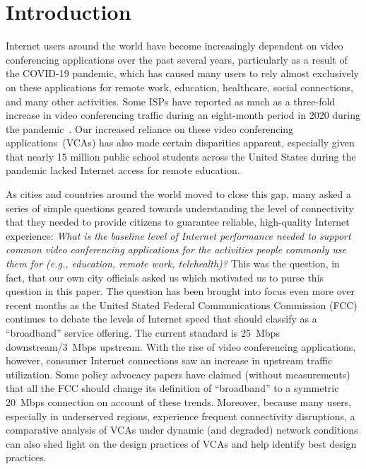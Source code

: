 \section{Introduction}\label{sec:intro}

Internet users around the world have become increasingly dependent on video
conferencing applications over the past several years, particularly as a
result of the COVID-19 pandemic, which has caused many users to rely almost
exclusively on these applications for remote work, education, healthcare,
social connections, and many other activities.  Some ISPs have reported as
much as a three-fold increase in video conferencing traffic during an
eight-month period in 2020 during the pandemic~\cite{bitag_report}. Our
increased reliance on these video conferencing applications~(VCAs) has also
made certain disparities apparent, especially given that nearly 15 million
public school students across the United States during the pandemic lacked
Internet access for remote education. 

As cities and countries around the world moved to close this gap, many asked a
series of simple questions geared towards understanding the level of
connectivity that they needed to provide citizens to guarantee reliable,
high-quality Internet experience: {\em What is the baseline level of Internet
performance needed to support common video conferencing applications for the
activities people commonly use them for (e.g., education, remote work,
telehealth)?} This was the question, in fact, that our own city officials
asked us which motivated us to purse this question in this paper. The question
has been brought into focus even more over recent months as the United Stated
Federal Communications Commission (FCC) continues to debate the levels of
Internet speed that should classify as a ``broadband'' service offering. The
current standard is 25~Mbps downstream/3~Mbps upstream. With the rise of video
conferencing applications, however, consumer Internet connections saw an
increase in upstream traffic utilization. Some policy advocacy papers have
claimed (without measurements) that all the FCC should change its definition
of ``broadband'' to a symmetric 20~Mbps connection on account of these trends.
Moreover, because many users, especially in underserved regions, experience
frequent connectivity disruptions, a comparative analysis of VCAs under
dynamic (and degraded) network conditions can also shed light on the design
practices of VCAs and help identify best design practices.

